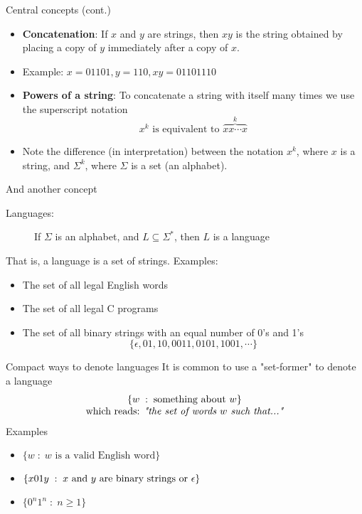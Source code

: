 \documentclass{prosper}%
\newcommand{\egk}{\mbox{$\epsilon$}}
\begin{document}
\begin{slide}{Central concepts (cont.)}
\begin{itemize}
\item {\bf Concatenation}: If $x$ and $y$ are strings, then $xy$ is the string obtained by placing a copy of $y$ immediately after a copy of $x$.

\item Example: $x=01101, y=110, xy= 01101110$

\item {\bf Powers of a string}: To concatenate a string with itself many times we use the superscript notation
\[
x^k\mbox{\ is equivalent to\ }\overbrace{xx\cdots x}^k
\]
\item Note the difference (in interpretation) between the notation $x^k$, where $x$ is a string, and  $\Sigma^k$, where $\Sigma$ is a set (an alphabet).
\end{itemize}
\end{slide}

\begin{slide}{And another  concept}
\begin{description}
\item[Languages:] If $\Sigma$ is an alphabet, and $L\subseteq\Sigma^*$, then $L$ is a language
\end{description}
That is, a language is a set of strings. Examples:
\begin{itemize}
\item The set of all legal English words
\item The set of all legal C programs
\item The set of all binary strings with an equal number of 0's and 1's
\[
\{\egk, 01,10, 0011, 0101, 1001,\cdots\}
\]
\end{itemize}
\end{slide}

\begin{slide}{Compact ways to denote languages}
It is common to use a "set-former" to denote a language 
\[
\begin{array}{c}
\{w\;:\;\mbox{something about $w$}\}\\ 
\mbox{which reads: \em "the set of words $w$ such that..."}
\end{array}
\]
Examples
\begin{itemize}
\item \(\{w\;:\; \mbox{$w$ is a valid English word}\}\)
\item \(
\{x01y \;:\; \mbox{$x$ and $y$ are binary strings or \egk}\}
\)
\item \(\{0^n1^n\;:\;n\geq 1\}\)
\end{itemize}
\end{slide}
\end{document}
